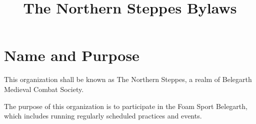 \documentclass[12pt]{article}
\title{The Northern Steppes Bylaws}
\begin{document}




\section{Name and Purpose}
\begin{level}
    \item This organization shall be known as The Northern Steppes, a realm of Belegarth Medieval Combat Society.
    \item The purpose of this organization is to participate in the Foam Sport Belegarth, which includes running regularly scheduled practices and events.
\end{level}
\end{document}

